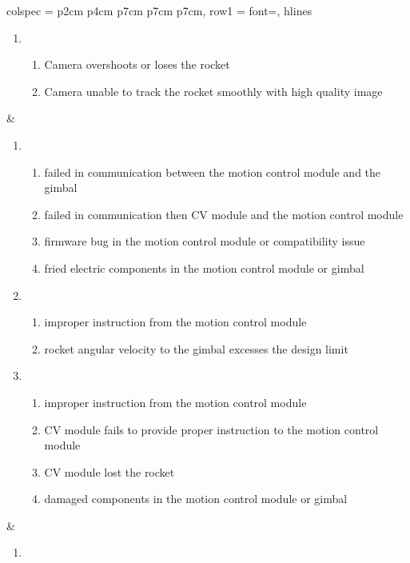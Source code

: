 \documentclass{article}
\begin{document}
\begin{table}[htbp]
{\begin{tblr}{
        colspec = {p{2cm} p{4cm} p{7cm} p{7cm} p{7cm}},
        row{1} = {font=\bfseries},
        hlines
      }
\begin{enumerate}
\begin{enumerate}
              \end{enumerate}
        \item \begin{enumerate}
                \item Camera overshoots or loses the rocket
                \item Camera unable to track the rocket smoothly with high quality image
              \end{enumerate}
      \end{enumerate}
                                              &
      \begin{enumerate}
        \item \begin{enumerate}
                \item failed in communication between the motion control module and the gimbal
                \item failed in communication then CV module and the motion control module
                \item firmware bug in the motion control module or compatibility issue
                \item fried electric components in the motion control module or gimbal
              \end{enumerate}
        \item \begin{enumerate}
                \item improper instruction from the motion control module
                \item rocket angular velocity to the gimbal excesses the design limit
              \end{enumerate}
        \item \begin{enumerate}
                \item improper instruction from the motion control module
                \item CV module fails to provide proper instruction to the motion control module
                \item CV module lost the rocket
                \item damaged components in the motion control module or gimbal
              \end{enumerate}
      \end{enumerate}
                                              &
      \begin{enumerate}
        \item \begin{enumerate}

\end{enumerate}
\end{enumerate}
\end{tblr}}
\end{table}
\end{document}
